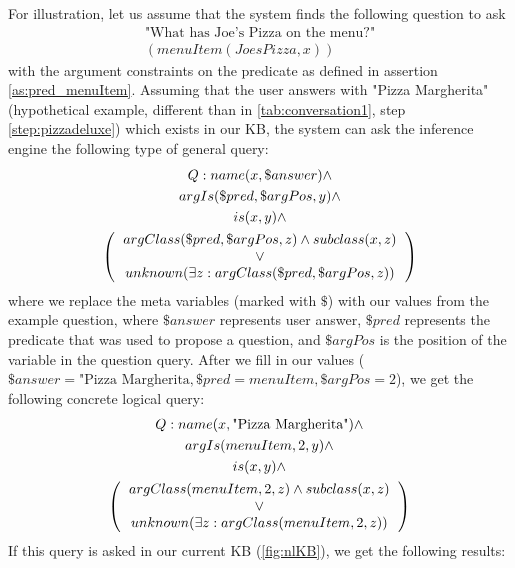 For illustration, let us assume that the system finds the following question to
ask 
\begin{equation*}
\begin{gathered}
\text{"What has Joe's Pizza on the menu?"}\\
(menuItem(JoesPizza,x))
\end{gathered}
\end{equation*}
with the argument constraints on the predicate as defined in assertion 
\ref{as:pred_menuItem}. Assuming that the user answers with "Pizza Margherita"
(hypothetical example, different than in \autoref{tab:conversation1}, step
\ref{step:pizzadeluxe}) which exists in our KB, the system can ask the inference
engine the following type of general query:
\begin{equation}\label{q:generalConstraint}
\begin{gathered}
    Q:name(x,\$answer)\land \\ %
    argIs(\$pred,\$argPos,y)\land \\ %
    is(x,y)\land \\
    \left(
    \begin{tabular}{c}
        $argClass(\$pred,\$argPos,z) \land  subclass(x,z)$\\
        $\lor$\\
        $unknown(\exists z:argClass(\$pred,\$argPos,z))$ \\
    \end{tabular}
    \right)
\end{gathered}
\end{equation}
where we replace the meta variables (marked with $\$$) with our values from 
the example question, where $\$answer$ represents user answer, $\$pred$ 
represents the predicate that was used to propose a question, and 
$\$argPos$ is the position of the variable in the question query. After we
fill in our values ($\$answer=\text{"Pizza Margherita}, \$pred=menuItem, 
\$argPos=2$), we get the following concrete logical query:
\begin{equation}\label{q:constraintQuery}
\begin{gathered}
   Q:name(x,\text{"Pizza Margherita"})\land \\ 
    argIs(menuItem,2,y)\land \\
    is(x,y)\land \\
    \left(
    \begin{tabular}{c}
        $argClass(menuItem,2,z) \land  subclass(x,z)$\\
        $\lor$\\
        $unknown(\exists z: argClass(menuItem,2,z))$ \\
    \end{tabular}
    \right)
\end{gathered}
\end{equation}
If this query is asked in our current KB (\autoref{fig:nlKB}), we get the 
following results:

